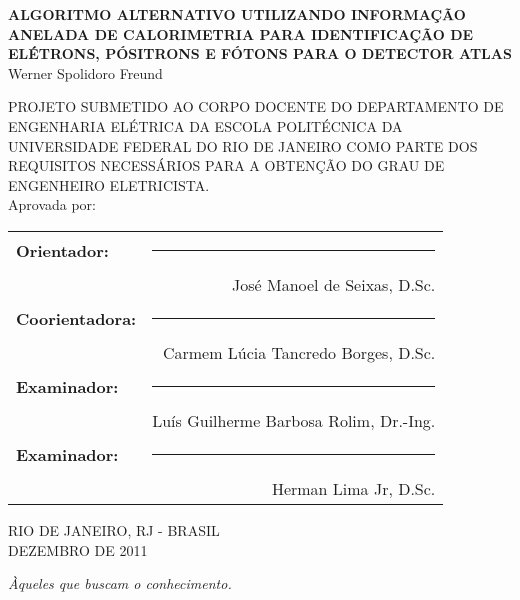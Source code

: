 \begin{titlepage}
	\begin{center}
		{\large \uppercase{\bf{Algoritmo Alternativo utilizando informação anelada
de calorimetria para identificação de elétrons, pósitrons e fótons para 
o detector ATLAS}}}\\[0.9cm]
    {Werner Spolidoro Freund}\\[0.9cm]
  \end{center}

		{\uppercase{\footnotesize{PROJETO SUBMETIDO AO CORPO DOCENTE DO DEPARTAMENTO 
DE ENGENHARIA ELÉTRICA DA ESCOLA POLITÉCNICA DA UNIVERSIDADE FEDERAL DO RIO 
DE JANEIRO COMO PARTE DOS REQUISITOS NECESSÁRIOS PARA A OBTENÇÃO DO GRAU 
DE ENGENHEIRO ELETRICISTA.}}}\\[0.3cm]

    {Aprovada por:}

  \begin{flushright}
		\begin{tabular}{lr}
			{\bf Orientador:} & \rule{8cm}{0.4pt} \\
					 & José Manoel de Seixas, D.Sc. \\[0.5cm]
			{\bf Coorientadora:}& \rule{8cm}{0.4pt} \\ 
					 & Carmem Lúcia Tancredo Borges, D.Sc. \\[0.5cm]
			{\bf Examinador:}& \rule{8cm}{0.4pt} \\
					 & Luís Guilherme Barbosa Rolim, Dr.-Ing. \\[0.5cm]
			{\bf Examinador:}& \rule{8cm}{0.4pt} \\
					 & Herman Lima Jr, D.Sc. \\[0.5cm]
		\end{tabular}
	\end{flushright}
  \vfill
  \begin{center}
		\begin{large}
      \uppercase{
			RIO DE JANEIRO, RJ - BRASIL \\
      DEZEMBRO DE 2011}
		\end{large}
  \end{center}
\end{titlepage}

\clearpage

\null
\vfill
\begin{flushright}
  \em{Àqueles que buscam o conhecimento.}\\
\end{flushright}
